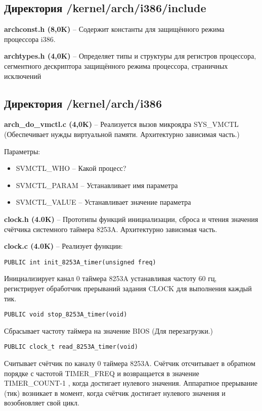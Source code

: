 \subsection{Директория /kernel/arch/i386/include}

\textbf{archconst.h (8,0K)} -- Содержит константы для защищённого режима процессора i386.

\textbf{archtypes.h (4,0K)} -- Определяет типы и структуры для регистров процессора, сегментного дескриптора защищённого режима процессора, страничных исключений


\subsection{Директория /kernel/arch/i386}

\textbf{arch\_do\_vmctl.c (4,0K)} -- Реализуется вызов микроядра SYS\_VMCTL (Обеспечивает нужды виртуальной памяти. Архитектурно зависимая часть.)

Параметры:
\begin{itemize}
\item SVMCTL\_WHO -- Какой процесс?
\item SVMCTL\_PARAM -- Устанавливает имя параметра
\item SVMCTL\_VALUE -- Устанавливает значение параметра
\end{itemize}

\textbf{clock.h (4.0K)} -- Прототипы функций инициализации, сброса и чтения значения счётчика системного таймера 8253A. Архитектурно зависимая часть.

\textbf{clock.c (4.0K)} -- Реализует функции:

\begin{Verbatim}[frame=single]
PUBLIC int init_8253A_timer(unsigned freq)
\end{Verbatim}
Инициализирует канал 0 таймера 8253A устанавливая частоту 60 гц, регистрирует обработчик прерываний задания CLOCK для выполнения каждый тик.

\begin{Verbatim}[frame=single]
PUBLIC void stop_8253A_timer(void)
\end{Verbatim}
Сбрасывает частоту таймера на значение BIOS (Для перезагрузки.)

\begin{Verbatim}[frame=single]
PUBLIC clock_t read_8253A_timer(void)
\end{Verbatim}
Считывает счётчик по каналу 0 таймера 8253A. Счётчик отсчитывает в обратном порядке с частотой TIMER\_FREQ и возвращается в значение TIMER\_COUNT-1 , когда достигает нулевого значения. Аппаратное прерывание (тик) возникает в момент, когда счётчик достигает нулевого значения и возобновляет свой цикл.

